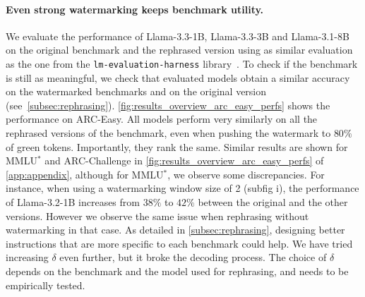 \paragraph{\textbf{Even strong watermarking keeps benchmark utility.}} 
We evaluate the performance of Llama-3.3-1B, Llama-3.3-3B and Llama-3.1-8B on the original benchmark and the rephrased version using as similar evaluation as the one from the \texttt{lm-evaluation-harness} library~\citep{eval-harness}.
To check if the benchmark is still as meaningful, we check that evaluated models obtain a similar accuracy on the watermarked benchmarks and on the original version (see~\autoref{subsec:rephrasing}).
\autoref{fig:results_overview_arc_easy_perfs} shows the performance on ARC-Easy.
All models perform very similarly on all the rephrased versions of the benchmark, even when pushing the watermark to $80\%$ of green tokens.
Importantly, they rank the same.
Similar results are shown for MMLU$^*$ and ARC-Challenge in \autoref{fig:results_overview_arc_easy_perfs} of \autoref{app:appendix}, although for MMLU$^*$, we observe some discrepancies. 
For instance, when using a watermarking window size of 2 (subfig i), the performance of Llama-3.2-1B increases from 38$\%$ to $42\%$ between the original and the other versions. 
However we observe the same issue when rephrasing without watermarking in that case.
As detailed in \autoref{subsec:rephrasing}, designing better instructions that are more specific to each benchmark could help.
We have tried increasing $\delta$ even further, but it broke the decoding process. 
The choice of $\delta$ depends on the benchmark and the model used for rephrasing, and needs to be empirically tested.



